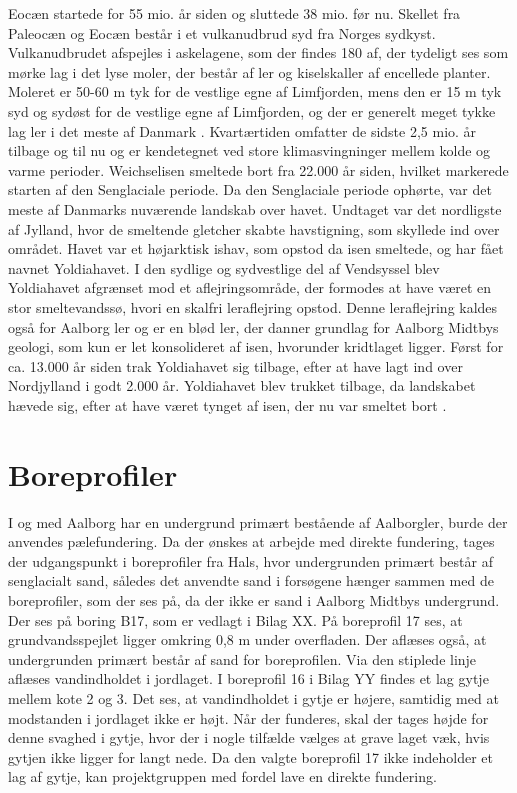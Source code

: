 \newline \indent{     }  Eocæn startede for 55 mio. år siden og sluttede 38 mio. før nu. Skellet fra Paleocæn og Eocæn består i et vulkanudbrud syd fra Norges sydkyst. Vulkanudbrudet afspejles i askelagene, som der findes 180 af, der tydeligt ses som mørke lag i det lyse moler, der består af ler og kiselskaller af encellede planter. Moleret er 50-60 m tyk for de vestlige egne af Limfjorden, mens den er 15 m tyk syd og sydøst for de vestlige egne af Limfjorden, og der er generelt meget tykke lag ler i det meste af Danmark \citep{geopdf}.
\newline
\newline
Kvartærtiden omfatter de sidste 2,5 mio. år tilbage og til nu og er kendetegnet ved store klimasvingninger mellem kolde og varme perioder. Weichselisen smeltede bort fra 22.000 år siden, hvilket markerede starten af den Senglaciale periode. Da den Senglaciale periode ophørte, var det meste af Danmarks nuværende landskab over havet. Undtaget var det nordligste af Jylland, hvor de smeltende gletcher skabte havstigning, som skyllede ind over området. Havet var et højarktisk ishav, som opstod da isen smeltede, og har fået navnet Yoldiahavet. I den sydlige og sydvestlige del af Vendsyssel blev Yoldiahavet afgrænset mod et aflejringsområde, der formodes at have været en stor smeltevandssø, hvori en skalfri leraflejring opstod. Denne leraflejring kaldes også for Aalborg ler og er en blød ler, der danner grundlag for Aalborg Midtbys geologi, som kun er let konsolideret af isen, hvorunder kridtlaget ligger. Først for ca. 13.000 år siden trak Yoldiahavet sig tilbage, efter at have lagt ind over Nordjylland i godt 2.000 år. Yoldiahavet blev trukket tilbage, da landskabet hævede sig, efter at have været tynget af isen, der nu var smeltet bort \citep{geopdf}.

\section{Boreprofiler} 
I og med Aalborg har en undergrund primært bestående af Aalborgler, burde der anvendes pælefundering. Da der ønskes at arbejde med direkte fundering, tages der udgangspunkt i boreprofiler fra Hals, hvor undergrunden primært består af senglacialt sand, således det anvendte sand i forsøgene hænger sammen med de boreprofiler, som der ses på, da der ikke er sand i Aalborg Midtbys undergrund. Der ses på boring B17, som er vedlagt i Bilag XX.  
\newline \indent{     }  På boreprofil 17 ses, at grundvandsspejlet ligger omkring 0,8 m under overfladen. Der aflæses også, at undergrunden primært består af sand for boreprofilen. Via den stiplede linje aflæses vandindholdet i jordlaget. 
\newline \indent{     }  I boreprofil 16 i Bilag YY findes et lag gytje mellem kote 2 og 3. Det ses, at vandindholdet i gytje er højere, samtidig med at modstanden i jordlaget ikke er højt. Når der funderes, skal der tages højde for denne svaghed i gytje, hvor der i nogle tilfælde vælges at grave laget væk, hvis gytjen ikke ligger for langt nede. Da den valgte boreprofil 17 ikke indeholder et lag af gytje, kan projektgruppen med fordel lave en direkte fundering.